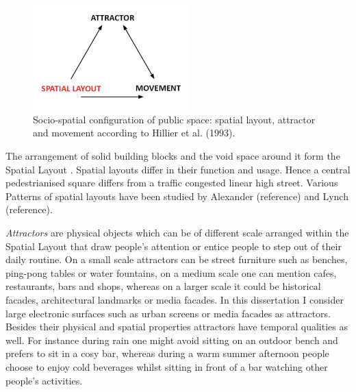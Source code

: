 \begin{figure}[h!] 
\centering
\includegraphics[width=6cm]{Illustrations/attractor_movement.pdf}
\caption [Spatial Layout, Attractor, Movement] {Socio-spatial configuration of public space: spatial layout, attractor and movement according to Hillier et al. (1993).}
\label{attractor_movement}
\end{figure}


The arrangement of solid building blocks and the void space around it form the Spatial Layout . Spatial layouts differ in their function and usage. Hence a central pedestrianised square differs from a traffic congested linear high street. 
Various Patterns of spatial layouts have been studied by Alexander (reference) and Lynch (reference).

\textit{Attractors} are physical objects which can be of different scale arranged  within the Spatial Layout that draw people's attention or entice people to step out of their daily routine. On a small scale attractors can be street furniture such as benches, ping-pong tables or water fountains, on a medium scale one can mention cafes, restaurants, bars and shops, whereas on a larger scale it could be historical facades, architectural landmarks or media facades. In this dissertation I consider large electronic surfaces such as urban screens or media facades as attractors. Besides their physical and spatial properties attractors have temporal qualities as well. For instance during rain one might avoid sitting on an outdoor bench and prefers to sit in a cosy bar, whereas during a warm summer afternoon people choose to enjoy cold beverages whilst sitting in front of a bar watching other people's activities.

